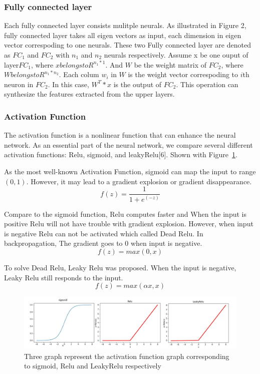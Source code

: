 \documentclass[runningheads]{llncs}
\begin{document}
\subsubsection{Fully connected layer}
Each fully connected layer consists mulitple neurals. As illustrated in Figure 2, fully connected layer takes all eigen vectors as input, each dimension in eigen vector correspoding to one neurals. These two Fully connected layer are denoted as $FC_1$ and $FC_2$ with $n_1$ and $n_2$ neurals respectively. Assume x be one ouput of layer$FC_1$, where $x belongs to R^{{n_1}*1}$. And $W$ be the weight matrix of $FC_2$, where $W belongs to R^{{n_1}*{n_2}}$. Each colum $w_i$ in $W$ is the weight vector correspoding to $i$th neuron in $FC_2$. In this case, $W^T*x$ is the output of $FC_2$. This operation can synthesize the features extracted from the upper layers. 

\subsubsection{Activation Function}
The activation function is a nonlinear function that can enhance the neural network. As an essential part of the neural network, we compare several different activation functions: Relu, sigmoid, and leakyRelu[6]. Shown with Figure~\ref{fig3}.

As the most well-known Activation Function, sigmoid can map the input to range $(0,1)$. However, it may lead to a gradient explosion or gradient disappearance.
\begin{equation}
	f(z)=\frac{1}{1+e^(-z)}
\end{equation}

Compare to the sigmoid function, Relu computes faster and When the input is positive Relu will not have trouble with gradient explosion. However, when input is negative Relu can not be activated which called Dead Relu. In backpropagation, The gradient goes to 0 when input is negative.
\begin{equation}
	f(z)=max(0,x)
\end{equation}

To solve Dead Relu, Leaky Relu was proposed. When the input is negative, Leaky Relu still responds to the input.
\begin{equation}
	f(z)=max(\alpha x,x)
\end{equation}

\begin{figure}
	\includegraphics[width=18cm]{fig3.jpg}
	\caption{Three graph represent the activation function graph corresponding to sigmoid, Relu and LeakyRelu respectively} \label{fig3}
\end{figure}
\end{document}
